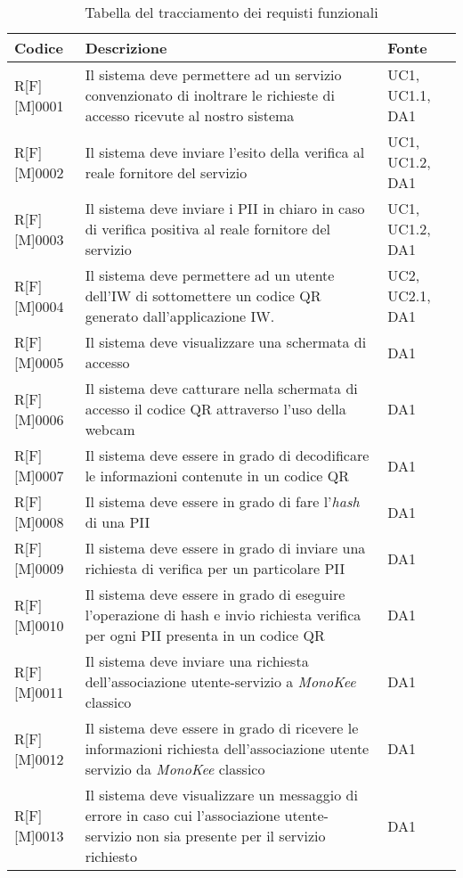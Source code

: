 \newpage
\begin{center}
\begin{longtable}{|p{2cm}|p{9cm}|p{2cm}|}%
\caption{Tabella del tracciamento dei requisti funzionali}
\label{tab:requisiti-funzionali-sp}
\endfirsthead
\endhead
\hline
\textbf{Codice} & \textbf{Descrizione} & \textbf{Fonte}\\
\hline
R[F][M]0001     & Il sistema deve permettere ad un servizio convenzionato di inoltrare le richieste di accesso ricevute al nostro sistema & UC1, UC1.1, DA1 \\
\hline
R[F][M]0002     & Il sistema deve inviare l’esito della verifica al reale fornitore del servizio & UC1, UC1.2, DA1 \\
\hline
R[F][M]0003     & Il sistema deve inviare i PII in chiaro in caso di verifica positiva al reale fornitore del servizio & UC1, UC1.2, DA1 \\
\hline
R[F][M]0004     & Il sistema deve permettere ad un utente dell’IW di sottomettere un codice QR generato dall’applicazione IW. & UC2, UC2.1, DA1 \\
\hline
R[F][M]0005     & Il sistema deve visualizzare una schermata di accesso & DA1 \\
\hline
R[F][M]0006     & Il sistema deve catturare nella schermata di accesso il codice QR attraverso l’uso della webcam & DA1 \\
\hline
R[F][M]0007     & Il sistema deve essere in grado di decodificare le informazioni contenute in un codice QR & DA1 \\
\hline
R[F][M]0008     & Il sistema deve essere in grado di fare l’\textit{hash} di una PII & DA1 \\
\hline
R[F][M]0009     & Il sistema deve essere in grado di inviare una richiesta di verifica per un particolare PII  & DA1 \\
\hline
R[F][M]0010     & Il sistema deve essere in grado di eseguire l’operazione di hash e invio richiesta verifica per ogni PII presenta in un codice QR & DA1 \\
\hline
R[F][M]0011     & Il sistema deve inviare una richiesta dell’associazione utente-servizio a \textit{MonoKee} classico & DA1 \\
\hline
R[F][M]0012     & Il sistema deve essere in grado di ricevere le informazioni richiesta dell’associazione utente servizio da \textit{MonoKee} classico & DA1 \\
\hline
R[F][M]0013     & Il sistema deve visualizzare un messaggio di errore in caso cui l’associazione utente-servizio non sia presente per il servizio richiesto & DA1 \\

\end{longtable}
\end{center}
